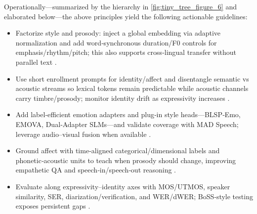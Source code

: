 Operationally—summarized by the hierarchy in \autoref{fig:tiny_tree_figure_6} and elaborated below—the above principles yield the following actionable guidelines:
\begin{itemize}
\item Factorize style and prosody: inject a global embedding via adaptive normalization and add word‑synchronous duration/F0 controls for emphasis/rhythm/pitch; this also supports cross‑lingual transfer without parallel text \cite{huang2023holisticcascadesystembenchmarkhumanevalu}.
\item Use short enrollment prompts for identity/affect and disentangle semantic vs acoustic streams so lexical tokens remain predictable while acoustic channels carry timbre/prosody; monitor identity drift as expressivity increases \cite{wang2024evaluatingtextspeechsynthesislargediscre}.
\item Add label‑efficient emotion adapters and plug‑in style heads—BLSP‑Emo, EMOVA, Dual‑Adapter SLMs—and validate coverage with MAD Speech; leverage audio–visual fusion when available \cite{wang2024blspemotowardsempatheticlargespeechlangu,futeral2025madspeechmeasuresacousticdiversity,chen2025emovaempoweringlanguagemodelsseehearspea,wang2025dualinformationspeechlanguagemodelsemoti}.
\item Ground affect with time‑aligned categorical/dimensional labels and phonetic‑acoustic units to teach when prosody should change, improving empathetic QA and speech‑in/speech‑out reasoning \cite{wang2025incorporatingcontextualparalinguisticund,har-tuv2025pastphoneticacousticspeechtokenizer,entry2025indicsuperbspeechprocessinguniversalperf}.
\item Evaluate along expressivity–identity axes with MOS/UTMOS, speaker similarity, SER, diarization/verification, and WER/dWER; BoSS‑style testing exposes persistent gaps \cite{wang2025bossbeyondsemanticspeech}.
\end{itemize}

